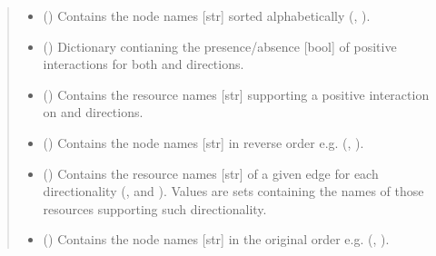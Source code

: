 \documentclass[letterpaper,10pt,english]{sphinxmanual}
\begin{document}
\begin{fulllineitems}
\begin{quote}
\begin{description}
\begin{itemize}
\item {} 
 () \textendash{} Contains the node names {[}str{]} sorted alphabetically (,
).

\item {} 
 () \textendash{} Dictionary contianing the presence/absence {[}bool{]} of positive
interactions for both  and 
directions.

\item {} 
 () \textendash{} Contains the resource names {[}str{]} supporting a positive
interaction on  and 
directions.

\item {} 
 () \textendash{} Contains the node names {[}str{]} in reverse order e.g. (,
).

\item {} 
 () \textendash{} Contains the resource names {[}str{]} of a given edge for each
directionality (,  and
). Values are sets containing the names of those
resources supporting such directionality.

\item {} 
 () \textendash{} Contains the node names {[}str{]} in the original order e.g.
(, ).

\end{itemize}

\end{description}\end{quote}


\end{fulllineitems}
\end{document}
